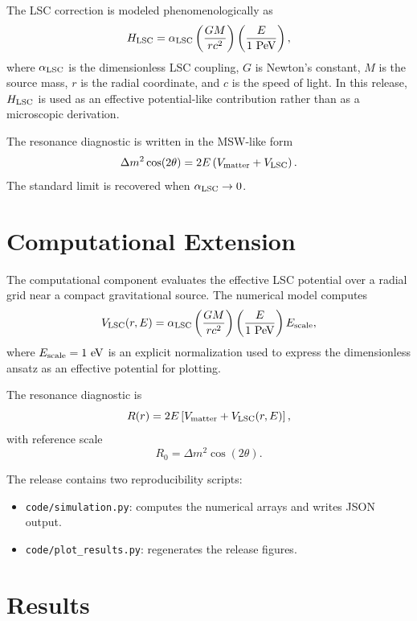 \documentclass[11pt]{article}
\begin{document}
The LSC correction is modeled phenomenologically as
\begin{equation}
 H_{\rm LSC}=\alpha_{\rm LSC}
 \left(\frac{GM}{r c^2}\right)
 \left(\frac{E}{1~{\rm PeV}}\right),
\end{equation}
where $\alpha_{\rm LSC}$ is the dimensionless LSC coupling, $G$ is Newton's constant, $M$ is the source mass, $r$ is the radial coordinate, and $c$ is the speed of light. In this release, $H_{\rm LSC}$ is used as an effective potential-like contribution rather than as a microscopic derivation.

The resonance diagnostic is written in the MSW-like form
\begin{equation}
 \Delta m^2\cos(2\theta)=2E\left(V_{\rm matter}+V_{\rm LSC}\right).
\end{equation}
The standard limit is recovered when $\alpha_{\rm LSC}\rightarrow 0$.

\section{Computational Extension}

The computational component evaluates the effective LSC potential over a radial grid near a compact gravitational source. The numerical model computes
\begin{equation}
 V_{\rm LSC}(r,E)=\alpha_{\rm LSC}
 \left(\frac{GM}{r c^2}\right)
 \left(\frac{E}{1~{\rm PeV}}\right)E_{\rm scale},
\end{equation}
where $E_{\rm scale}=1~{\rm eV}$ is an explicit normalization used to express the dimensionless ansatz as an effective potential for plotting.

The resonance diagnostic is
\begin{equation}
 R(r)=2E\left[V_{\rm matter}+V_{\rm LSC}(r,E)\right],
\end{equation}
with reference scale
\begin{equation}
 R_0=\Delta m^2\cos(2\theta).
\end{equation}

The release contains two reproducibility scripts:
\begin{itemize}
 \item \texttt{code/simulation.py}: computes the numerical arrays and writes JSON output.
 \item \texttt{code/plot\_results.py}: regenerates the release figures.
\end{itemize}

\section{Results}
\end{document}
